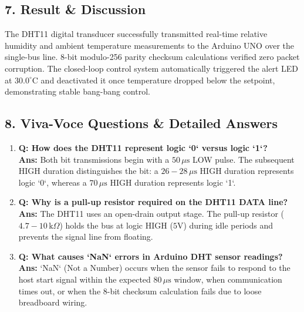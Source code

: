 \documentclass[11pt,a4paper]{article}
\begin{document}
\subsection*{7. Result \& Discussion}
The DHT11 digital transducer successfully transmitted real-time relative humidity and ambient temperature measurements to the Arduino UNO over the single-bus line. 8-bit modulo-256 parity checksum calculations verified zero packet corruption. The closed-loop control system automatically triggered the alert LED at $30.0^\circ\text{C}$ and deactivated it once temperature dropped below the setpoint, demonstrating stable bang-bang control.

\subsection*{8. Viva-Voce Questions \& Detailed Answers}
\begin{enumerate}[leftmargin=*]
    \item \textbf{Q: How does the DHT11 represent logic `0` versus logic `1`?}\\
    \textbf{Ans:} Both bit transmissions begin with a $50\,\mu\text{s}$ LOW pulse. The subsequent HIGH duration distinguishes the bit: a $26-28\,\mu\text{s}$ HIGH duration represents logic `0`, whereas a $70\,\mu\text{s}$ HIGH duration represents logic `1`.
    \item \textbf{Q: Why is a pull-up resistor required on the DHT11 DATA line?}\\
    \textbf{Ans:} The DHT11 uses an open-drain output stage. The pull-up resistor ($4.7-10\,\text{k}\Omega$) holds the bus at logic HIGH ($5\text{V}$) during idle periods and prevents the signal line from floating.
    \item \textbf{Q: What causes `NaN` errors in Arduino DHT sensor readings?}\\
    \textbf{Ans:} `NaN` (Not a Number) occurs when the sensor fails to respond to the host start signal within the expected $80\,\mu\text{s}$ window, when communication times out, or when the 8-bit checksum calculation fails due to loose breadboard wiring.
\end{enumerate}
\end{document}
